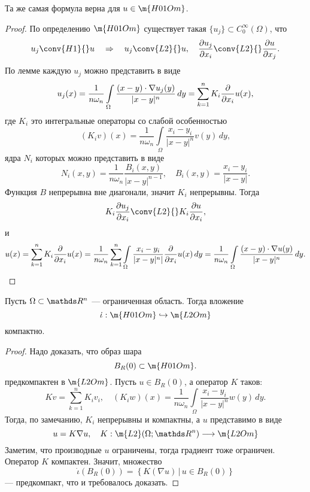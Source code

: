 \begin{note}
Та же самая формула верна для $u \in \m{H01Om}$.
\end{note}
\begin{proof}
По определению $\m{H01Om}$ существует такая $\{ u_j \} \subset C_0^\infty(\Omega)$, что
$$ u_j \conv{H1}{} u \quad \Rightarrow \quad u_j \conv{L2}{} u, \quad \pder[u_j]{x_i} \conv{L2}{} \pder[u]{x_j}.$$
По лемме каждую $u_j$ можно представить в виде
$$ u_j(x) = \frac{1}{n \omega_n} \int \limits_\Omega \frac{(x-y) \cdot \nabla u_j(y)} {|x-y|^n} \, dy = \sum_{k=1}^n K_i \frac{\partial}{\partial x_i} u(x),$$
где $K_i$ это интегральные операторы со слабой особенностью
$$ (K_i v)(x) = \frac {1} {n \omega_n} \int \limits_\Omega \frac{x_i - y_i}{|x-y|^n} v(y) \, dy,$$
ядра $N_i$ которых можно представить в виде
$$ N_i (x,y) = \frac {1} {n \omega_n} \frac {B_i (x,y)} {|x-y|^{n-1}}, \quad B_i(x,y) = \frac {x_i - y_i} {|x-y|}.$$
Функция $B$ непрерывна вне диагонали, значит $K_i$ непрерывны. Тогда
$$ K_i \pder[u_j]{x_i} \conv{L2}{} K_i \pder[u]{x_i},$$
и
$$ u(x) = \sum_{k=1}^n K_i \frac{\partial}{\partial x_i}u(x) = \frac {1} {n \omega_n} \sum_{k=1}^n \int \limits_\Omega \frac {x_i - y_i} {|x-y|^n|} \frac{\partial}{\partial x_i}u(x) \, dy = \frac {1} {n \omega_n} \int \limits_\Omega \frac {(x-y) \cdot \nabla u(y)} {|x-y|^n} \, dy. $$

\end{proof} 

\begin{theorem} Пусть $\Omega \subset \real^n$ --- ограниченная область. Тогда вложение
$$\dot{\iota} : \m{H01Om} \hookrightarrow \m{L2Om}$$
компактно.
\end{theorem}
\begin{proof}
Надо доказать, что образ шара 
$$B_R (0) \subset \m{H01Om}.$$
предкомпактен в $\m{L2Om}$. Пусть $u \in B_R(0)$, а оператор $K$ таков:
$$ Kv = \sum_{k=1}^n K_i v_i, \quad (K_i w)(x) = \frac {1} {n \omega_n} \int \limits_\Omega \frac {x_i - y_i} {|x-y|^n} w(y) \, dy.$$
Тогда, по замечанию, $K_i$ непрерывны и компактны, а $u$ представимо в виде
$$ u = K \nabla u, \quad K : \m{L2}(\Omega ; \real^n) \longrightarrow \m{L2Om}$$
Заметим, что производные $u$ ограничены, тогда градиент тоже ограничен. Оператор $K$ компактен. Значит, множество
$$ \dot\iota (B_R(0)) = \left\{ K (\nabla u) \, \Big| \, u \in B_R(0) \right\}$$
--- предкомпакт, что и требовалось доказать.

\end{proof}

